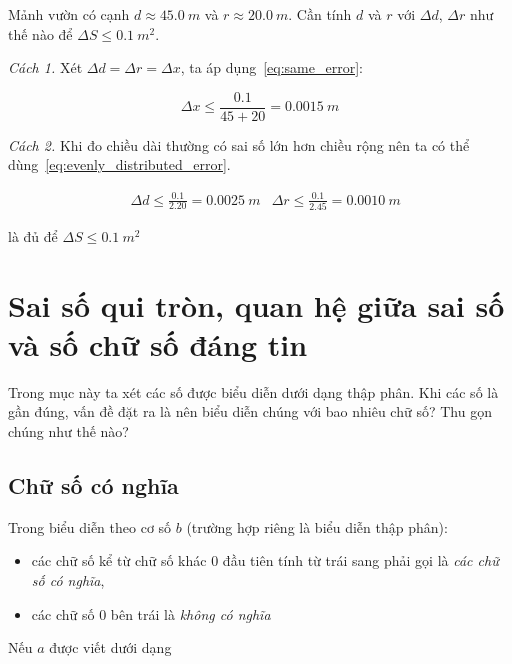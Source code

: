 \documentclass[../../Lectures.tex]{subfiles}
\begin{document}
\begin{exmp}
    Mảnh vườn có cạnh \(d \approx \SI{45.0}{m}\) và \(r \approx
    \SI{20.0}{m}\). Cần tính \(d\) và \(r\) với \(\Delta d\), \(\Delta r\) như
    thế nào để \(\Delta S \leq \SI{0.1}{m^2}\).

    \emph{Cách 1.}
    Xét \(\Delta d = \Delta r = \Delta x\), ta áp dụng~\ref{eq:same_error}:

    \[\Delta x \leq \frac{\num{0.1}}{45 + 20} = \SI{0.0015}{m}\]

    \emph{Cách 2.}
    Khi đo chiều dài thường có sai số lớn hơn chiều rộng nên ta có thể
    dùng~\ref{eq:evenly_distributed_error}.

    \[\begin{aligned}
        &\Delta d \leq \frac{\num{0.1}}{\num{2.20}} = \SI{0.0025}{m}
        &\Delta r \leq \frac{\num{0.1}}{\num{2.45}} = \SI{0.0010}{m}
    \end{aligned}\]

    là đủ để \(\Delta S \leq \SI{0.1}{m^2}\)
\end{exmp}

\section[Sai số quy tròn, quan hệ sai số \& số chữ số chắc]{Sai số qui tròn, quan hệ giữa sai số và số chữ số đáng tin}

Trong mục này ta xét các số được biểu diễn dưới dạng thập phân. Khi các số là
gần đúng, vấn đề đặt ra là nên biểu diễn chúng với bao nhiêu chữ số? Thu gọn
chúng như thế nào?

\subsection{Chữ số có nghĩa}

\begin{definition}
    Trong biểu diễn theo cơ số \(b\) (trường hợp riêng là biểu diễn thập phân):

    \begin{itemize}
        \item các chữ số kể từ chữ số khác \(0\) đầu tiên tính từ trái sang phải
            gọi là \emph{các chữ số có nghĩa},
        \item các chữ số \(0\) bên trái là \emph{không có nghĩa}
    \end{itemize}
\end{definition}

Nếu \(a\) được viết dưới dạng
\end{document}
